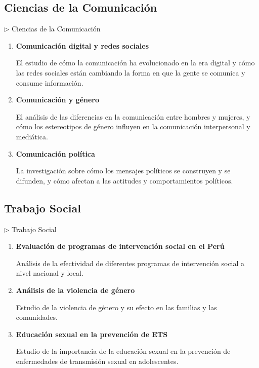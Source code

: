\documentclass[12pt,a4paper]{article}
\begin{document}
\subsection{Ciencias de la Comunicación}

\begin{careerbox}{$\triangleright$ Ciencias de la Comunicación}
	\begin{enumerate}
		\item \textbf{Comunicación digital y redes sociales}
		
		El estudio de cómo la comunicación ha evolucionado en la era digital y cómo las redes sociales están cambiando la forma en que la gente se comunica y consume información.
		
		\item \textbf{Comunicación y género}
		
		El análisis de las diferencias en la comunicación entre hombres y mujeres, y cómo los estereotipos de género influyen en la comunicación interpersonal y mediática.
		
		\item \textbf{Comunicación política}
		
		La investigación sobre cómo los mensajes políticos se construyen y se difunden, y cómo afectan a las actitudes y comportamientos políticos.
	\end{enumerate}
\end{careerbox}

\subsection{Trabajo Social}

\begin{careerbox}{$\triangleright$ Trabajo Social}
	\begin{enumerate}
		\item \textbf{Evaluación de programas de intervención social en el Perú}
		
		Análisis de la efectividad de diferentes programas de intervención social a nivel nacional y local.
		
		\item \textbf{Análisis de la violencia de género}
		
		Estudio de la violencia de género y su efecto en las familias y las comunidades.
		
		\item \textbf{Educación sexual en la prevención de ETS}
		
		Estudio de la importancia de la educación sexual en la prevención de enfermedades de transmisión sexual en adolescentes.
	\end{enumerate}
\end{careerbox}
\end{document}
